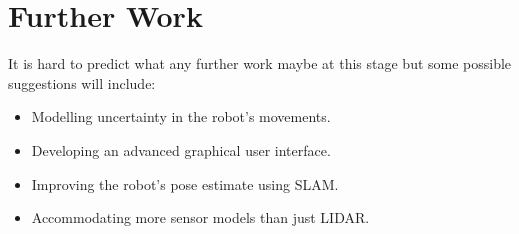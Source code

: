 \chapter{Further Work}


It is hard to predict what any further work maybe at this stage but some possible suggestions will include:

\begin{itemize}
\item Modelling uncertainty in the robot's movements.
\item Developing an advanced graphical user interface.
\item Improving the robot's pose estimate using SLAM.
\item Accommodating more sensor models than just LIDAR.
\end{itemize}